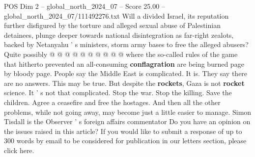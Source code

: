 \begin{textsample}{POS Dim 2 – global\_north\_2024\_07 – Score 25.00 – global\_north\_2024\_07/111492276.txt}
Will a divided Israel, its reputation further disfigured by the torture and alleged sexual abuse of Palestinian detainees, plunge deeper towards national disintegration as far-right zealots, backed by Netanyahu ' s ministers, storm army bases to free the alleged abusers?
Quite possibly @ @ @ @ @ @ @ @ @ @ where the so-called rules of the game that hitherto prevented an all-consuming \textbf{conflagration} are being burned page by bloody page.
People say the Middle East is complicated.
It is.
They say there are no answers.
This may be true.
But despite the \textbf{rockets}, Gaza is not \textbf{rocket} science.
It ' s not that complicated.
Stop the war.
Stop the killing.
Save the children.
Agree a ceasefire and free the hostages.
And then all the other problems, while not going away, may become just a little easier to manage.
Simon Tisdall is the Observer ' s foreign affairs commentator Do you have an opinion on the issues raised in this article?
If you would like to submit a response of up to 300 words by email to be considered for publication in our letters section, please click here.

\end{textsample}
